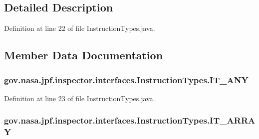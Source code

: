 \subsection{Detailed Description}


Definition at line 22 of file Instruction\+Types.\+java.



\subsection{Member Data Documentation}
\subsubsection[{\texorpdfstring{I\+T\+\_\+\+A\+NY}{IT_ANY}}]{\setlength{\rightskip}{0pt plus 5cm}gov.\+nasa.\+jpf.\+inspector.\+interfaces.\+Instruction\+Types.\+I\+T\+\_\+\+A\+NY}\hypertarget{enumgov_1_1nasa_1_1jpf_1_1inspector_1_1interfaces_1_1_instruction_types_aad3f4c8aaddc54deef4cdfb64608db7c}{}\label{enumgov_1_1nasa_1_1jpf_1_1inspector_1_1interfaces_1_1_instruction_types_aad3f4c8aaddc54deef4cdfb64608db7c}


Definition at line 23 of file Instruction\+Types.\+java.

\subsubsection[{\texorpdfstring{I\+T\+\_\+\+A\+R\+R\+AY}{IT_ARRAY}}]{\setlength{\rightskip}{0pt plus 5cm}gov.\+nasa.\+jpf.\+inspector.\+interfaces.\+Instruction\+Types.\+I\+T\+\_\+\+A\+R\+R\+AY}\hypertarget{enumgov_1_1nasa_1_1jpf_1_1inspector_1_1interfaces_1_1_instruction_types_aea2b6d85109ce1f26ad9f80c9fb4d56d}{}\label{enumgov_1_1nasa_1_1jpf_1_1inspector_1_1interfaces_1_1_instruction_types_aea2b6d85109ce1f26ad9f80c9fb4d56d}


